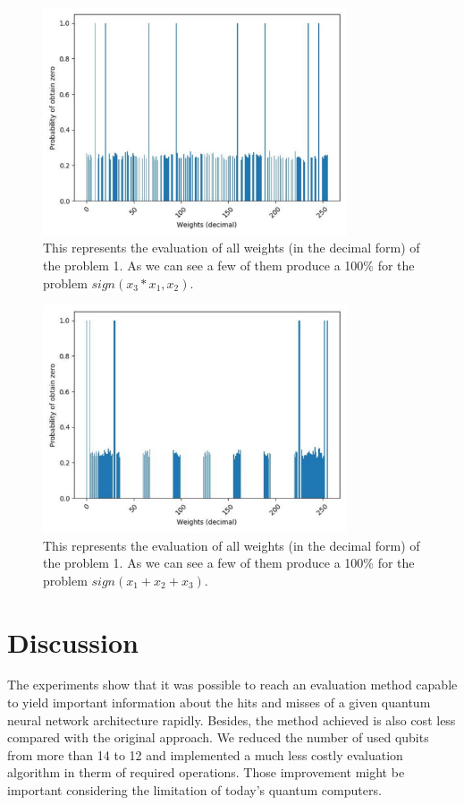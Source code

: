 \documentclass[conference]{IEEEtran}
\begin{document}
    \begin{figure}[h!]
    \centering
    \includegraphics[width=9cm, scale=0.4]{images/problem_1.pdf}
    \caption{This represents the evaluation of all weights (in the decimal form) of the problem 1.
    As we can see a few of them produce a 100\% for the problem \(sign(x_3*x_1, x_2)\).}\label{Fig:problem_1}
    \end{figure}

    \begin{figure}[h!]
        \centering
        \includegraphics[width=9cm, scale=0.4]{images/problem_2.pdf}
        \caption{This represents the evaluation of all weights (in the decimal form) of the problem 1.
        As we can see a few of them produce a 100\% for the problem \(sign(x_1 + x_2 + x_3)\).}\label{Fig:problem_2}
    \end{figure}

\section{Discussion}\label{sec:discussion}

The experiments show that it was possible to reach an evaluation method capable to yield important information about the
hits and misses of a given quantum neural network architecture rapidly.
Besides, the method achieved is also cost less compared with the original approach.
We reduced the number of used qubits from more than 14\cite{fawaz2019training} to 12 and implemented a much less costly
evaluation algorithm in therm of required operations.
Those improvement might be important considering the limitation of today's quantum computers\cite{fawaz2019training}.
\end{document}
